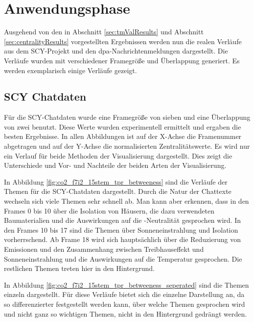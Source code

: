 \section{Anwendungsphase}

Ausgehend von den in Abschnitt \ref{sec:tmValResults} und Abschnitt \ref{sec:centralityResults} vorgestellten Ergebnissen werden nun die realen Verläufe aus dem SCY-Projekt und den dpa-Nachrichtenmeldungen dargestellt. Die Verläufe wurden mit verschiedener Framegröße und Überlappung generiert. Es werden exemplarisch einige Verläufe gezeigt.

\subsection{SCY Chatdaten}
Für die SCY-Chatdaten wurde eine Framegröße von sieben und eine Überlappung von zwei benutzt. Diese Werte wurden experimentell ermittelt und ergaben die besten Ergebnisse. In allen Abbildungen ist auf der X-Achse die Framenummer abgetragen und auf der Y-Achse die normalisierten Zentralitätswerte. Es wird nur ein Verlauf für beide Methoden der Visualisierung dargestellt. Dies zeigt die Unterschiede und Vor- und Nachteile der beiden Arten der Visualisierung.

In Abbildung \ref{fig:co2_f7i2_15stem_tpr_betweeness} sind die Verläufe der Themen für die SCY-Chatdaten dargestellt. Durch die Natur der Chattexte wechseln sich viele Themen sehr schnell ab. Man kann aber erkennen, dass in den Frames 0 bis 10 über die Isolation von Häusern, die dazu verwendeten Baumaterialien und die Auswirkungen auf die \COTWO-Neutralität gesprochen wird. In den Frames 10 bis 17 sind die Themen über Sonneneinstrahlung und Isolation vorherrschend. Ab Frame 18 wird sich hauptsächlich über die Reduzierung von Emissionen und den Zusammenhang zwischen Treibhauseffekt und Sonneneinstrahlung und die Auswirkungen auf die Temperatur gesprochen. Die restlichen Themen treten hier in den Hintergrund.

In Abbildung \ref{fig:co2_f7i2_15stem_tpr_betweeness_seperated} sind die Themen einzeln dargestellt. Für diese Verläufe bietet sich die einzelne Darstellung an, da so differenzierter festgestellt werden kann, über welche Themen gesprochen wird und nicht ganz so wichtigen Themen, nicht in den Hintergrund gedrängt werden.

